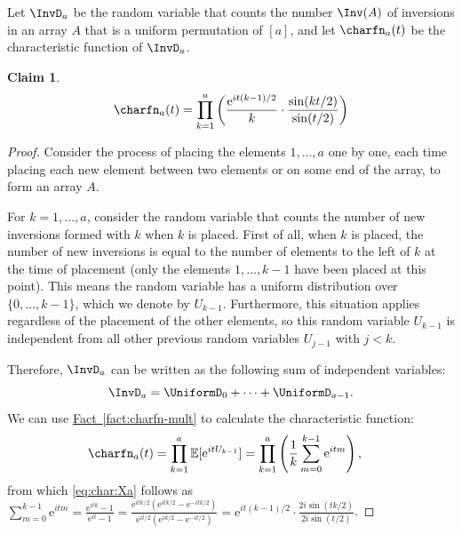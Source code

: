 \documentclass[11pt]{article}
\numberwithin{equation}{section}
\newtheorem{claim}[theorem]{Claim}
\theoremstyle{definition}
\theoremstyle{plain}
\newcommand{\eee}{\mathrm e}
\newcommand{\expref}[2]{\hyperref[#2]{#1~\ref{#2}}}
\begin{document}
Let $\InvD_a$ be the random variable that counts the number $\Inv(A)$ of inversions in an array $A$ that is a uniform permutation of $[a]$, and let $\charfn_a(t)$ be the characteristic function of $\InvD_a$.
\begin{claim}
    \label{claim:inversion-charfn}
    \begin{align}\label{eq:char:Xa}
    \charfn_a(t)=\prod_{k=1}^{a}\left(\frac{\eee^{it(k-1)/2}}{k}\cdot\frac{\sin(kt/2)}{\sin(t/2)}\right) 
    \end{align}
\end{claim}
\begin{proof}
Consider the process of placing the elements $1,\dots,a$ one by one, each time placing each new element between two elements or on some end of the array, to form an array $A$. 

For $k=1,\dots,a$, consider the random variable that counts the number of new inversions formed with $k$ when $k$ is placed. First of all, when $k$ is placed, the number of new inversions is equal to the number of elements to the left of $k$ at the time of placement (only the elements $1,\dots,k-1$ have been placed at this point). This means the random variable has a uniform distribution over $\{0,\dots,k-1\}$, which we denote by $U_{k-1}$. Furthermore, this situation applies regardless of the placement of the other elements, so this random variable $U_{k-1}$ is independent from all other previous random variables $U_{j-1}$ with $j<k$. 

Therefore, $\InvD_a$ can be written as the following sum of independent variables:
\[\InvD_a = \UniformD_0 + \dots + \UniformD_{a-1}. \]
We can use \expref{Fact}{fact:charfn-mult} to calculate the characteristic function:
\begin{align*}
\charfn_a(t)&=\prod_{k=1}^{a} \mathbb{E}[\eee^{itU_{k-1}}]=\prod_{k=1}^{a}\left(\frac{1}{k}\sum_{m=0}^{k-1} \eee^{itm}\right),
\end{align*}
from which \eqref{eq:char:Xa} follows as
$\sum_{m=0}^{k-1} \eee^{itm} 
= \frac{\eee^{itk}-1}{\eee^{it}-1} 
= \frac{\eee^{itk/2}(\eee^{itk/2}-\eee^{-itk/2})}{\eee^{it/2}(\eee^{ik/2}-\eee^{-it/2})} 
= \eee^{it(k-1)/2} \cdot \frac{2i\sin(tk/2)}{2i\sin(t/2)}$.
\end{proof}
\end{document}
